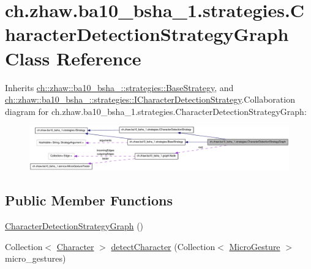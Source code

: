 \hypertarget{classch_1_1zhaw_1_1ba10__bsha__1_1_1strategies_1_1CharacterDetectionStrategyGraph}{
\section{ch.zhaw.ba10\_\-bsha\_\-1.strategies.CharacterDetectionStrategyGraph Class Reference}
\label{classch_1_1zhaw_1_1ba10__bsha__1_1_1strategies_1_1CharacterDetectionStrategyGraph}
}


Inherits \hyperlink{classch_1_1zhaw_1_1ba10__bsha__1_1_1strategies_1_1BaseStrategy}{ch::zhaw::ba10\_\-bsha\_::strategies::BaseStrategy}, and \hyperlink{interfacech_1_1zhaw_1_1ba10__bsha__1_1_1strategies_1_1ICharacterDetectionStrategy}{ch::zhaw::ba10\_\-bsha\_::strategies::ICharacterDetectionStrategy}.Collaboration diagram for ch.zhaw.ba10\_\-bsha\_\-1.strategies.CharacterDetectionStrategyGraph:\nopagebreak
\begin{figure}[H]
\begin{center}
\leavevmode
\includegraphics[width=400pt]{classch_1_1zhaw_1_1ba10__bsha__1_1_1strategies_1_1CharacterDetectionStrategyGraph__coll__graph}
\end{center}
\end{figure}
\subsection*{Public Member Functions}
\begin{DoxyCompactItemize}
\item 
\hyperlink{classch_1_1zhaw_1_1ba10__bsha__1_1_1strategies_1_1CharacterDetectionStrategyGraph_aac7a339a3686ece943ad17ccc97bc901}{CharacterDetectionStrategyGraph} ()
\item 
Collection$<$ \hyperlink{classch_1_1zhaw_1_1ba10__bsha__1_1_1Character}{Character} $>$ \hyperlink{classch_1_1zhaw_1_1ba10__bsha__1_1_1strategies_1_1CharacterDetectionStrategyGraph_af5d1202b6a9878b247cf4c5176102dd5}{detectCharacter} (Collection$<$ \hyperlink{classch_1_1zhaw_1_1ba10__bsha__1_1_1service_1_1MicroGesture}{MicroGesture} $>$ micro\_\-gestures)
\end{DoxyCompactItemize}
